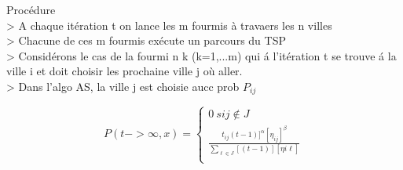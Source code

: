 Procédure \\
> A chaque it\'eration t on lance les m fourmis \`a travaers les n villes\\
> Chacune de ces m fourmis ex\'ecute un parcours du TSP\\
> Consid\'erons le cas de la fourmi n k (k=1,...m) qui \'a l'it\'eration t se trouve \'a la ville i et doit choisir les prochaine ville j o\`u aller.\\
> Dans l'algo AS, la ville j est choisie aucc prob $P_{ij}$ 
\begin{center}
$$ P(t->\infty,x)= \left\{
                \begin{array}{ll}
                  0 \ si j \notin J \\
                  \frac{t_{ij}(t-1)]^\alpha [\eta_{ij}]^\beta}{\displaystyle\sum_{\ell\in J} [(t-1)][\eta{i\ell}]}\\
                \end{array}
              \right.
  $$
\end{center}






